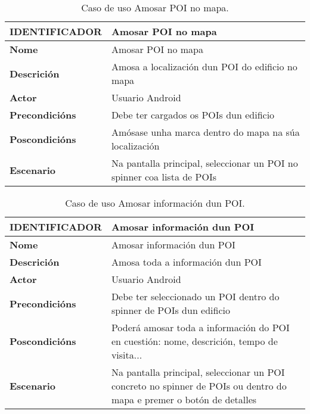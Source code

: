 \begin{table}[tbh]
	\footnotesize
	\centering
	\begin{tabular}{|l|p{10cm}|}
		\hline 
		\textbf{IDENTIFICADOR}	& \textbf{Amosar POI no mapa} \\ 
		\hline 
		\textbf{Nome} & Amosar POI no mapa \\ 
		\hline 
		\textbf{Descrición} & Amosa a localización dun POI do edificio no mapa \\ 
		\hline 
		\textbf{Actor} & Usuario Android \\ 
		\hline 
		\textbf{Precondicións} & Debe ter cargados os POIs dun edificio \\ 
		\hline 
		\textbf{Poscondicións} & Amósase unha marca dentro do mapa na súa localización \\ 
		\hline 
		\textbf{Escenario} & Na pantalla principal, seleccionar un POI no spinner coa lista de POIs \\ 
		\hline 
	\end{tabular}
	\caption{Caso de uso Amosar POI no mapa.}
	\label{tab:cuAmosarPOIMapa}
\end{table}

\begin{table}[tbh]
	\footnotesize
	\centering
	\begin{tabular}{|l|p{10cm}|}
		\hline 
		\textbf{IDENTIFICADOR}	& \textbf{Amosar información dun POI} \\ 
		\hline 
		\textbf{Nome} & Amosar información dun POI \\ 
		\hline 
		\textbf{Descrición} & Amosa toda a información dun POI \\ 
		\hline 
		\textbf{Actor} & Usuario Android \\ 
		\hline 
		\textbf{Precondicións} & Debe ter seleccionado un POI dentro do spinner de POIs dun edificio \\ 
		\hline 
		\textbf{Poscondicións} & Poderá amosar toda a información do POI en cuestión: nome, descrición, tempo de visita... \\ 
		\hline 
		\textbf{Escenario} & Na pantalla principal, seleccionar un POI concreto no spinner de POIs ou dentro do mapa e premer o botón de detalles \\ 
		\hline 
	\end{tabular}
	\caption{Caso de uso Amosar información dun POI.}
	\label{tab:cuAmosarPOI}
\end{table}

